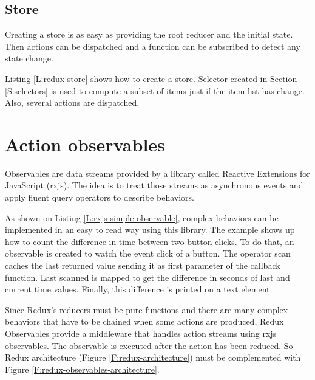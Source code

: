 \subsection{Store}

Creating a store is as easy as providing the root reducer and the initial state.
Then actions can be dispatched and a function can be subscribed to detect any
state change.

Listing \ref{L:redux-store} shows how to create a store. Selector created in
Section \ref{S:selectors} is used to compute a subset of items just if the
item list has change. Also, several actions are dispatched.

\begin{codefigure}
\end{codefigure}

\section{Action observables}

Observables are data streams provided by a library called Reactive Extensions
for JavaScript (rxjs). The idea is to treat those streams as asynchronous 
events and apply fluent query operators to describe behaviors.

\begin{codefigure}
\end{codefigure}

As shown on Listing \ref{L:rxjs-simple-observable}, complex behaviors can be
implemented in an easy to read way using this library. The example shows up
how to count the difference in time between two button clicks. To do that, 
an observable is created to watch the event click of a button. The operator scan
caches the last returned value sending it as first parameter of the callback
function. Last scanned is mapped to get the difference in seconds of last
and current time values. Finally, this difference is printed on a text element.

Since Redux's reducers must be pure functions and there are many complex
behaviors that have to be chained when some actions are produced, Redux
Observables provide a middleware that handles action streams using rxjs
observables. The observable is executed after the action has been reduced.
So Redux architecture (Figure \ref{F:redux-architecture}) must be complemented 
with Figure \ref{F:redux-observables-architecture}.

